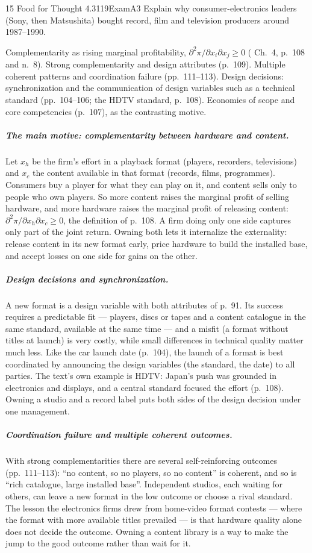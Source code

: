 \begin{exsol}{15}{\MR{} Food for Thought 4.3}{119}{Exam}{A3}
\asked Explain why consumer-electronics leaders (Sony, then Matsushita) bought record, film and
television producers around 1987--1990.

\method Complementarity as rising marginal profitability, $\partial^2\pi/\partial x_i\partial
x_j\ge0$ (\MR{} Ch.~4, p.~108 and n.~8). Strong complementarity and design attributes (p.~109).
Multiple coherent patterns and coordination failure (pp.~111--113). Design decisions:
synchronization and the communication of design variables such as a technical standard
(pp.~104--106; the HDTV standard, p.~108). Economies of scope and core competencies (p.~107), as the
contrasting motive.

\solution
\subparagraph{The main motive: complementarity between hardware and content.} Let $x_h$ be the
firm's effort in a playback format (players, recorders, televisions) and $x_c$ the content
available in that format (records, films, programmes). Consumers buy a player for what they can
play on it, and content sells only to people who own players. So more content raises the marginal
profit of selling hardware, and more hardware raises the marginal profit of releasing content:
$\partial^2\pi/\partial x_h\partial x_c\ge0$, the definition of p.~108. A firm doing only one side
captures only part of the joint return. Owning both lets it internalize the externality: release
content in its new format early, price hardware to build the installed base, and accept losses on
one side for gains on the other.

\subparagraph{Design decisions and synchronization.} A new format is a design variable with both
attributes of p.~91. Its success requires a predictable fit --- players, discs or tapes and a
content catalogue in the same standard, available at the same time --- and a misfit (a format
without titles at launch) is very costly, while small differences in technical quality matter
much less. Like the car launch date (p.~104), the launch of a format is best coordinated by
announcing the design variables (the standard, the date) to all parties. The text's own example is
HDTV: Japan's push was grounded in electronics and displays, and a central standard focused the
effort (p.~108). Owning a studio and a record label puts both sides of the design decision under
one management.

\subparagraph{Coordination failure and multiple coherent outcomes.} With strong complementarities
there are several self-reinforcing outcomes (pp.~111--113): ``no content, so no players, so no
content'' is coherent, and so is ``rich catalogue, large installed base''. Independent studios,
each waiting for others, can leave a new format in the low outcome or choose a rival standard. The
lesson the electronics firms drew from home-video format contests --- where the format with more
available titles prevailed --- is that hardware quality alone does not decide the outcome. Owning
a content library is a way to make the jump to the good outcome rather than wait for it.


\end{exsol}
